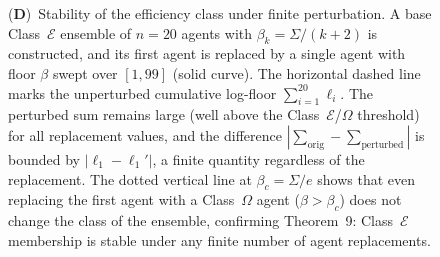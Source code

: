 \begin{figure}[!htbp]
{    (\textbf{D})~Stability of the efficiency class under finite perturbation.  A base Class~$\mathcal{E}$ ensemble of $n = 20$ agents with $\beta_k = \Sigma/(k+2)$ is constructed, and its first agent is replaced by a single agent with floor $\beta$ swept over $[1, 99]$ (solid curve).  The horizontal dashed line marks the unperturbed cumulative log-floor $\sum_{i=1}^{20} \ell_i$.  The perturbed sum remains large (well above the Class~$\mathcal{E}$/$\Omega$ threshold) for all replacement values, and the difference $|\sum_{\mathrm{orig}} - \sum_{\mathrm{perturbed}}|$ is bounded by $|\ell_1 - \ell_1'|$, a finite quantity regardless of the replacement.  The dotted vertical line at $\beta_c = \Sigma/e$ shows that even replacing the first agent with a Class~$\Omega$ agent ($\beta > \beta_c$) does not change the class of the ensemble, confirming Theorem~9: Class~$\mathcal{E}$ membership is stable under any finite number of agent replacements.}
    \label{fig:het_panel_5}
\end{figure}
